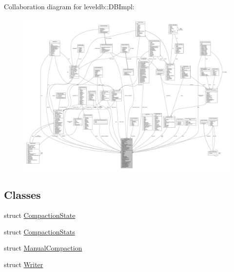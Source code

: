 Collaboration diagram for leveldb\+:\+:D\+B\+Impl\+:
\nopagebreak
\begin{figure}[H]
\begin{center}
\leavevmode
\includegraphics[width=350pt]{classleveldb_1_1_d_b_impl__coll__graph}
\end{center}
\end{figure}
\subsection*{Classes}
\begin{DoxyCompactItemize}
\item 
struct \hyperlink{structleveldb_1_1_d_b_impl_1_1_compaction_state}{Compaction\+State}
\item 
struct \hyperlink{structleveldb_1_1_d_b_impl_1_1_compaction_stats}{Compaction\+Stats}
\item 
struct \hyperlink{structleveldb_1_1_d_b_impl_1_1_manual_compaction}{Manual\+Compaction}
\item 
struct \hyperlink{structleveldb_1_1_d_b_impl_1_1_writer}{Writer}
\end{DoxyCompactItemize}

